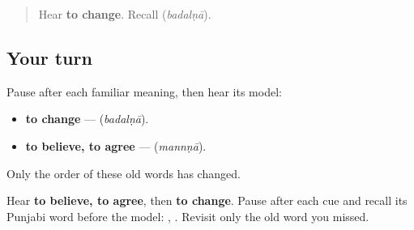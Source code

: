 \label{lesson:PA-R167-change-again}



\begin{quote}
Hear \textbf{to change}. Recall \textbf{} (\emph{badalṇā}).
\end{quote}

\subsection*{Your turn}
Pause after each familiar meaning, then hear its model:

\begin{itemize}
\raggedright
  \item \textbf{to change} — \textbf{} (\emph{badalṇā}).
  \item \textbf{to believe, to agree} — \textbf{} (\emph{mannṇā}).
\end{itemize}

Only the order of these old words has changed.

\begin{tcolorbox}[breakable,colback=teal!4,colframe=teal!35!black,title={Before you move on}]
Hear \textbf{to believe, to agree}, then \textbf{to change}. Pause after each cue and recall its Punjabi word before the model: \textbf{}, \textbf{}. Revisit only the old word you missed.
\end{tcolorbox}
